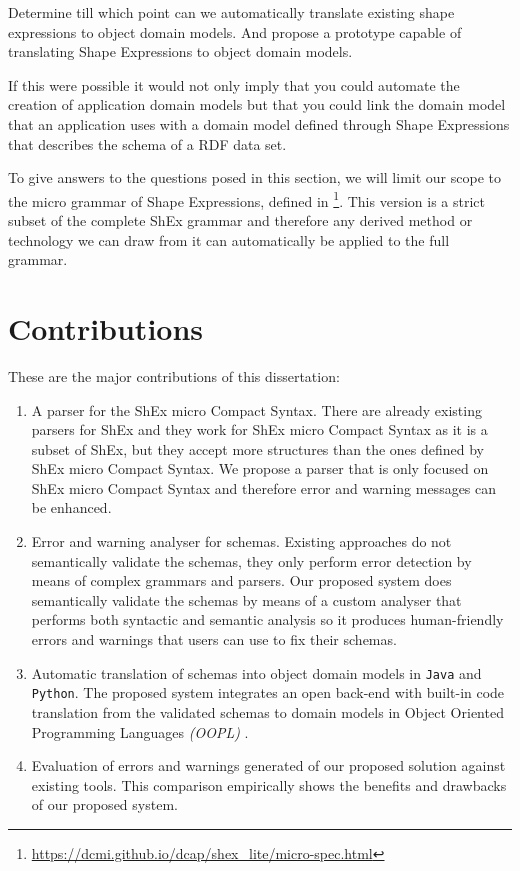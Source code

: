 \begin{researchquestion}
  Determine till which point can we automatically translate existing shape expressions to object domain models. And
  propose a prototype capable of translating Shape Expressions to object domain models.
\end{researchquestion}

If this were possible it would not only imply that you could automate the creation of application domain models but that you could link the domain model that an
application uses with a domain model defined through Shape Expressions that describes the schema of a RDF data set.

\bigskip

To give answers to the questions posed in this section, we will limit our scope to the micro grammar of Shape Expressions, defined in
\footnote{\url{https://dcmi.github.io/dcap/shex_lite/micro-spec.html}}. This version is a strict subset of the complete ShEx grammar
and therefore any derived method or technology we can draw from it can automatically be applied to the full grammar.


\section{Contributions}
\label{sec:intro-contri}
These are the major contributions of this dissertation:

\begin{enumerate}
  \item A parser for the ShEx micro Compact Syntax. There are already existing parsers for ShEx and they work for ShEx micro Compact Syntax
  as it is a subset of ShEx, but they accept more structures than the ones defined by ShEx micro Compact Syntax. We propose a parser that
  is only focused on ShEx micro Compact Syntax and therefore error and warning messages can be enhanced.
  
  \item Error and warning analyser for schemas. Existing approaches do not semantically validate the schemas, they
  only perform error detection by means of complex grammars and parsers. Our proposed system does semantically validate the schemas by means
  of a custom analyser that performs both syntactic and semantic analysis so it produces human-friendly errors and warnings that users can
  use to fix their schemas.

  \item Automatic translation of schemas into object domain models in \texttt{Java} and \texttt{Python}. The proposed system
  integrates an open back-end with built-in code translation from the validated schemas to domain models in Object
  Oriented Programming Languages \textit{(OOPL)} \cite{oopl}.

  \item Evaluation of errors and warnings generated of our proposed solution against existing tools. This comparison
  empirically shows the benefits and drawbacks of our proposed system.
\end{enumerate}

